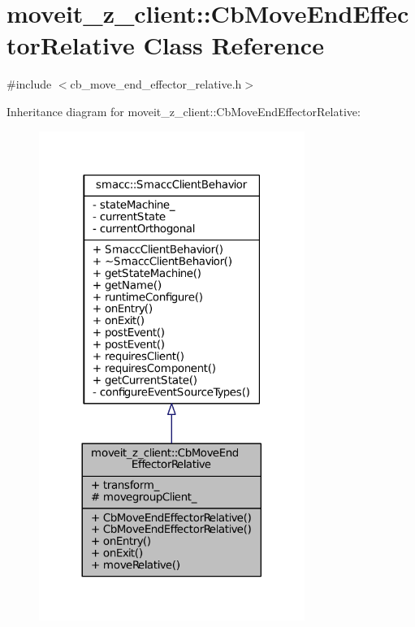 \hypertarget{classmoveit__z__client_1_1CbMoveEndEffectorRelative}{}\section{moveit\+\_\+z\+\_\+client\+:\+:Cb\+Move\+End\+Effector\+Relative Class Reference}
\label{classmoveit__z__client_1_1CbMoveEndEffectorRelative}


{\ttfamily \#include $<$cb\+\_\+move\+\_\+end\+\_\+effector\+\_\+relative.\+h$>$}



Inheritance diagram for moveit\+\_\+z\+\_\+client\+:\+:Cb\+Move\+End\+Effector\+Relative\+:
\nopagebreak
\begin{figure}[H]
\begin{center}
\leavevmode
\includegraphics[width=245pt]{classmoveit__z__client_1_1CbMoveEndEffectorRelative__inherit__graph}
\end{center}
\end{figure}


